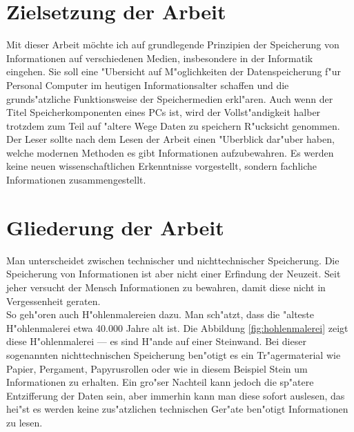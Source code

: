 \section{Zielsetzung der Arbeit}
\label{ch:Einleitung:sec:Zielsetzung}

Mit dieser Arbeit möchte ich auf grundlegende Prinzipien der Speicherung von Informationen auf verschiedenen Medien, insbesondere in der Informatik eingehen. Sie soll eine "Ubersicht auf M"oglichkeiten der Datenspeicherung f"ur Personal Computer im heutigen Informationsalter schaffen und die grunds"atzliche Funktionsweise der Speichermedien erkl"aren. Auch wenn der Titel \glqq Speicherkomponenten eines PCs\grqq{} ist, wird der Vollst"andigkeit halber trotzdem zum Teil auf "altere Wege Daten zu speichern R"ucksicht genommen. Der Leser sollte nach dem Lesen der Arbeit einen "Uberblick dar"uber haben, welche modernen Methoden es gibt Informationen aufzubewahren. Es werden keine neuen wissenschaftlichen Erkenntnisse vorgestellt, sondern fachliche Informationen zusammengestellt.

\section{Gliederung der Arbeit}
\label{ch:Einleitung:sec:Gliederung}

Man unterscheidet zwischen technischer und nichttechnischer Speicherung. Die Speicherung von Informationen ist aber nicht einer Erfindung der Neuzeit. Seit jeher versucht der Mensch Informationen zu bewahren, damit diese nicht in Vergessenheit geraten. 
\\
So geh"oren auch H"ohlenmalereien dazu. Man sch"atzt, dass die "alteste H"ohlenmalerei etwa 40.000 Jahre alt ist. Die Abbildung \ref{fig:hohlenmalerei}  zeigt diese H"ohlenmalerei --- es sind H"ande auf einer Steinwand. Bei dieser sogenannten nichttechnischen Speicherung ben"otigt es ein Tr"agermaterial wie Papier, Pergament, Papyrusrollen oder wie in diesem Beispiel Stein um Informationen zu erhalten. Ein gro"ser Nachteil kann jedoch die sp"atere Entzifferung der \glqq Daten\grqq{} sein, aber immerhin kann man diese sofort auslesen, das hei"st es werden keine zus"atzlichen technischen Ger"ate ben"otigt Informationen zu lesen.

